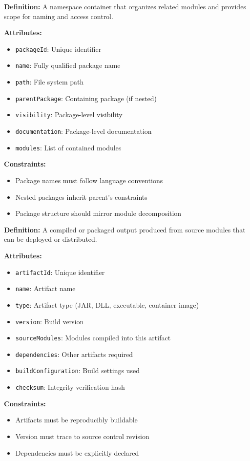 \documentclass[11pt,letterpaper]{article}
\begin{document}
\begin{definitionbox}
\textbf{Definition:} A namespace container that organizes related modules and provides scope for naming and access control.

\textbf{Attributes:}
\begin{itemize}[nosep]
    \item \texttt{packageId}: Unique identifier
    \item \texttt{name}: Fully qualified package name
    \item \texttt{path}: File system path
    \item \texttt{parentPackage}: Containing package (if nested)
    \item \texttt{visibility}: Package-level visibility
    \item \texttt{documentation}: Package-level documentation
    \item \texttt{modules}: List of contained modules
\end{itemize}

\textbf{Constraints:}
\begin{itemize}[nosep]
    \item Package names must follow language conventions
    \item Nested packages inherit parent's constraints
    \item Package structure should mirror module decomposition
\end{itemize}
\end{definitionbox}

\begin{definitionbox}
\textbf{Definition:} A compiled or packaged output produced from source modules that can be deployed or distributed.

\textbf{Attributes:}
\begin{itemize}[nosep]
    \item \texttt{artifactId}: Unique identifier
    \item \texttt{name}: Artifact name
    \item \texttt{type}: Artifact type (JAR, DLL, executable, container image)
    \item \texttt{version}: Build version
    \item \texttt{sourceModules}: Modules compiled into this artifact
    \item \texttt{dependencies}: Other artifacts required
    \item \texttt{buildConfiguration}: Build settings used
    \item \texttt{checksum}: Integrity verification hash
\end{itemize}

\textbf{Constraints:}
\begin{itemize}[nosep]
    \item Artifacts must be reproducibly buildable
    \item Version must trace to source control revision
    \item Dependencies must be explicitly declared
\end{itemize}
\end{definitionbox}
\end{document}
